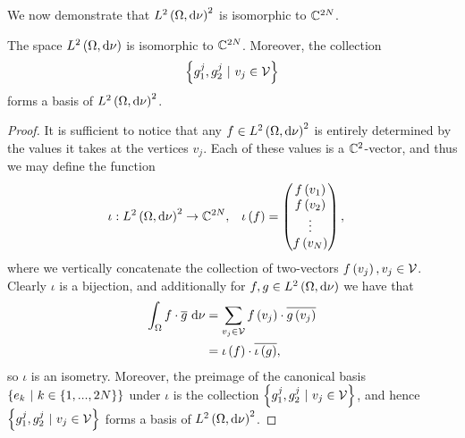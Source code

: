 We now demonstrate that $L^{2}\left( \Omega,\mathrm{d}\nu \right)^2$ is isomorphic to $\mathbb{C}^{2N}$.
\begin{lemma}
	The space $L^{2}\left( \Omega,\mathrm{d}\nu \right)$ is isomorphic to $\mathbb{C}^{2N}$.
	Moreover, the collection 
	\begin{align*}
		\left\{ g_1^j, g_2^j \ \vert \ v_j\in\mathcal{V} \right\}
	\end{align*}
	forms a basis of $L^{2}\left( \Omega,\mathrm{d}\nu \right)^2$.
\end{lemma}
\begin{proof}
	It is sufficient to notice that any $f\in L^{2}\left( \Omega,\mathrm{d}\nu \right)^2$ is entirely determined by the values it takes at the vertices $v_j$.
	Each of these values is a $\mathbb{C}^2$-vector, and thus we may define the function
	\begin{align*}
		\iota:L^{2}\left( \Omega,\mathrm{d}\nu \right)^2 \rightarrow\mathbb{C}^{2N}, &\quad
		\iota\left( f \right) = \begin{pmatrix} f\left( v_1 \right) \\ f\left( v_2 \right) \\ \vdots \\ f\left( v_N \right) \end{pmatrix},
	\end{align*}
	where we vertically concatenate the collection of two-vectors $f\left( v_j \right), v_j\in\mathcal{V}$.
	Clearly $\iota$ is a bijection, and additionally for $f,g\in L^{2}\left( \Omega,\mathrm{d}\nu \right)$ we have that
	\begin{align*}
		\int_{\Omega}f\cdot \overline{g} \ \mathrm{d}\nu &= \sum_{v_j\in\mathcal{V}} f\left( v_j \right)\cdot\overline{g\left( v_j \right)} \\
		&= \iota\left( f \right)\cdot\overline{\iota\left( g \right)},
	\end{align*}
	so $\iota$ is an isometry.
	Moreover, the preimage of the canonical basis $\clbracs{e_k \ \vert \ k\in\clbracs{1,...,2N}}$ under $\iota$ is the collection $\clbracs{g_1^j, g_2^j \ \vert \ v_j\in\vertSet}$, and hence $\clbracs{g_1^j, g_2^j \ \vert \ v_j\in\vertSet}$ forms a basis of $L^{2}\left( \Omega,\mathrm{d}\nu \right)^2$.
\end{proof}

